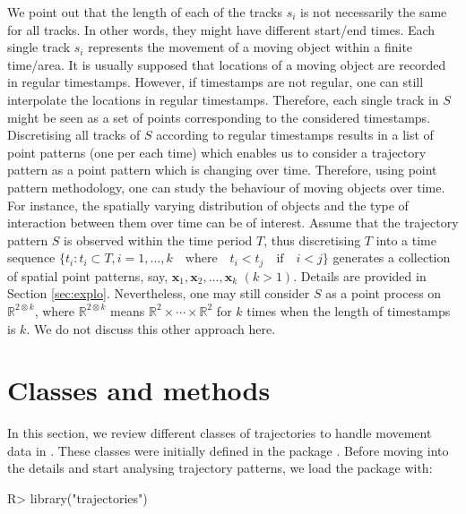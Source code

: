\documentclass[article]{jss}
\newcommand{\R}{\mathbb{R}}
\begin{document}
  We point out that the length of each of the tracks $s_i$ is not necessarily the same for all tracks. In other words, they might have different start/end times. Each single track $s_i$ represents the movement of a moving object within a finite time/area. It is usually supposed that locations of a moving object are recorded in regular timestamps. However, if timestamps are not regular, one can still interpolate the locations in regular timestamps. Therefore, each single track in $S$ might be seen as a set of points corresponding to the considered timestamps. Discretising all tracks of $S$ according to regular timestamps results in a list of point patterns (one per each time) which enables us to consider a trajectory pattern as a point pattern which is changing over time. Therefore, using point pattern methodology, one can study the behaviour of moving objects over time. For instance, the spatially varying distribution of objects and the type of interaction between them over time can be of interest. Assume that the trajectory pattern $S$ is observed within the time period $T$, thus discretising $T$ into a time sequence $\{t_i: t_i \subset T, i=1,\ldots,k \quad \text{where} \quad t_i < t_j \quad \text{if} \quad i< j \}$ generates a collection of spatial point patterns, say, $\textbf{x}_1,\textbf{x}_2, \ldots, \textbf{x}_k$ $(k>1)$.  Details are provided in Section \ref{sec:explo}. Nevertheless, one may still consider $S$ as a point process on $\R^{2\otimes k}$, where $\R^{2\otimes k}$ means $\R^2 \times \cdots \times \R^2$ for $k$ times when the length of timestamps is $k$. We do not discuss this other approach here.

\section{Classes and methods} \label{sec:classes}
In this section, we review different classes of trajectories to handle movement data in . These classes were initially defined in the  package  \citep{spacetime}. Before moving into the details and start analysing trajectory patterns, we load the package with:

\begin{Sinput}
R> library("trajectories")
\end{Sinput}
\end{document}
